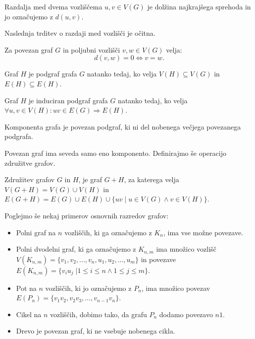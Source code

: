 \documentclass[mat1, tisk]{fmfdelo}
\begin{document}
\begin{definicija}
    Razdalja med dvema vozliščema $u, v \in V(G)$ je dolžina najkrajšega sprehoda in jo 
    označujemo z $d(u, v).$ 
\end{definicija}

Naslednja trditev o razdaji med vozlišči je očitna.

\begin{trditev} \label{nicelna_razdalja}
    Za povezan graf $G$ in poljubni vozlišči $v, w \in V(G)$ velja:
    $$ d(v, w) = 0 \Leftrightarrow v=w.$$
\end{trditev} 

\begin{definicija}
    Graf $H$ je podgraf grafa $G$ natanko tedaj, ko velja $V(H) \subseteq V(G)$ in 
    $E(H) \subseteq E(H)$.
\end{definicija}

\begin{definicija}
    Graf $H$ je induciran podgraf grafa $G$ natanko tedaj, ko velja 
    $\forall u, v \in V(H) : uv \in E(G) \Rightarrow E(H)$.
\end{definicija}

\begin{definicija}
Komponenta grafa je povezan podgraf, ki ni del nobenega večjega povezanega podgrafa. 
\end{definicija}

Povezan graf ima seveda samo eno komponento. Definirajmo še operacijo združitve grafov.

\begin{definicija}
    Združitev grafov $G$ in $H$, je graf $G + H$, za katerega velja $V(G + H) = V(G) \cup V(H)$ 
    in $E(G + H)  = E(G) \cup E(H) \cup \{ uv \;  | \;  u \in V(G) \land v \in V(H) \}.$
\end{definicija}

Poglejmo še nekaj primerov osnovnih razredov grafov:
\begin{itemize}
    \item Polni graf na $n$ vozliščih, ki ga označujemo z $K_n$, ima vse možne povezave.
    \item Polni dvodelni graf, ki ga označujemo z $K_{n, m}$ ima množico 
    vozlišč $V(K_{n,m}) = \{ v_1, v_2, ... , v_n , u_1, u_2, ... , u_m \}$
    in povezave $E(K_{n, m}) = \{ v_i u_j \; | 1 \leq i \leq n \land 1 \leq j \leq m \}.$ 
    \item Pot na $n$ vozliščih, ki jo označujemo z $P_n$, ima množico povezav 
    $E(P_n) = \{ v_1 v_2 , v_2 v_3 , ... , v_{n-1} v_n\}.$
    \item Cikel na $n$ vozliščih, dobimo tako, da grafu $P_n$ dodamo povezavo $n 1$.
    \item Drevo je povezan graf, ki ne vsebuje nobenega cikla.
\end{itemize}
\end{document}
